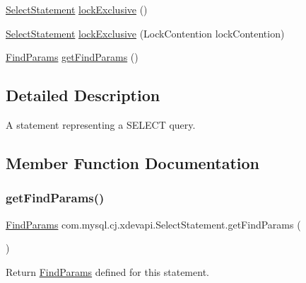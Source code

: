 \begin{DoxyCompactItemize}
\mbox{\hyperlink{interfacecom_1_1mysql_1_1cj_1_1xdevapi_1_1_select_statement}{Select\+Statement}} \mbox{\hyperlink{interfacecom_1_1mysql_1_1cj_1_1xdevapi_1_1_select_statement_a86b185579eb689c07a5691ba33c59821}{lock\+Exclusive}} ()
\item 
\mbox{\hyperlink{interfacecom_1_1mysql_1_1cj_1_1xdevapi_1_1_select_statement}{Select\+Statement}} \mbox{\hyperlink{interfacecom_1_1mysql_1_1cj_1_1xdevapi_1_1_select_statement_a993dc3e6fa92a41a1ce2cb1aff9e7c4a}{lock\+Exclusive}} (Lock\+Contention lock\+Contention)
\item 
\mbox{\hyperlink{interfacecom_1_1mysql_1_1cj_1_1xdevapi_1_1_find_params}{Find\+Params}} \mbox{\hyperlink{interfacecom_1_1mysql_1_1cj_1_1xdevapi_1_1_select_statement_aba9e71159f41003a6514960d37e4021b}{get\+Find\+Params}} ()
\end{DoxyCompactItemize}


\subsection{Detailed Description}
A statement representing a S\+E\+L\+E\+CT query. 

\subsection{Member Function Documentation}
\mbox{\label{interfacecom_1_1mysql_1_1cj_1_1xdevapi_1_1_select_statement_aba9e71159f41003a6514960d37e4021b}} 
\subsubsection{\texorpdfstring{get\+Find\+Params()}{getFindParams()}}
{\footnotesize\ttfamily \mbox{\hyperlink{interfacecom_1_1mysql_1_1cj_1_1xdevapi_1_1_find_params}{Find\+Params}} com.\+mysql.\+cj.\+xdevapi.\+Select\+Statement.\+get\+Find\+Params (\begin{DoxyParamCaption}{ }\end{DoxyParamCaption})}

Return \mbox{\hyperlink{interfacecom_1_1mysql_1_1cj_1_1xdevapi_1_1_find_params}{Find\+Params}} defined for this statement.

